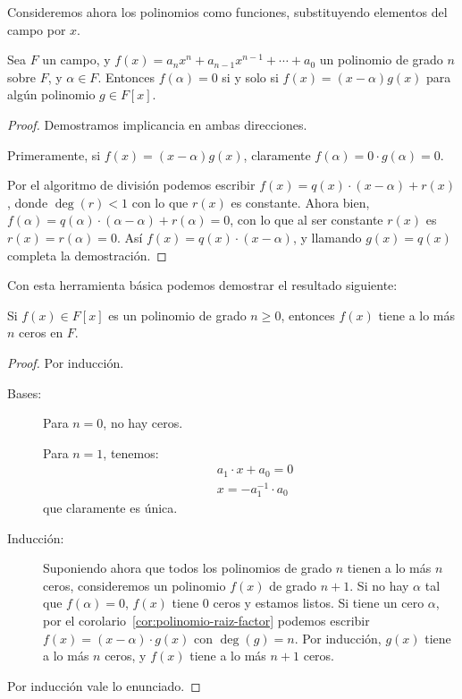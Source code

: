   Consideremos ahora los polinomios como funciones,
  substituyendo elementos del campo por \(x\).

  \begin{corollary}
    \label{cor:polinomio-raiz-factor}
    Sea \(F\) un campo,
    y \(f(x) = a_n x^n + a_{n - 1} x^{n - 1} + \dotsb + a_0\)
    un polinomio de grado \(n\) sobre \(F\),
    y \(\alpha \in F\).
    Entonces \(f(\alpha) = 0\)
    si y solo si \(f(x) = (x - \alpha) g(x)\)
    para algún polinomio \(g \in F[x]\).
  \end{corollary}
  \begin{proof}
    Demostramos implicancia en ambas direcciones.

    Primeramente,
    si \(f(x) = (x - \alpha) g(x)\),
    claramente \(f(\alpha) = 0 \cdot g(\alpha) = 0\).

    Por el algoritmo de división podemos escribir
    \(f(x) = q(x) \cdot (x - \alpha) + r(x)\),
    donde \(\deg(r) < 1\)
    con lo que \(r(x)\) es constante.
    Ahora bien,
    \(f(\alpha)
       = q(\alpha) \cdot (\alpha - \alpha) + r(\alpha) = 0\),
    con lo que al ser constante
      \(r(x)\) es \(r(x) = r(\alpha) = 0\).
    Así \(f(x) = q(x) \cdot (x - \alpha)\),
    y llamando \(g(x) = q(x)\) completa la demostración.
  \end{proof}
  Con esta herramienta básica podemos demostrar
  el resultado siguiente:
  \begin{corollary}
    \label{cor:numero-raices-polinomio}
    Si \(f(x) \in F[x]\) es un polinomio de grado \(n \ge 0\),
    entonces \(f(x)\) tiene a lo más \(n\) ceros en \(F\).
  \end{corollary}
  \begin{proof}
    Por inducción.%
    \begin{description}
    \item[Bases:]
      Para \(n = 0\),
      no hay ceros.

      Para \(n = 1\),
      tenemos:
      \begin{align*}
	&a_1 \cdot x + a_0
	  = 0 \\
	&x
	  = - a_1^{-1} \cdot a_0
      \end{align*}
      que claramente es única.
    \item[Inducción:]
      Suponiendo ahora que todos los polinomios de grado \(n\)
      tienen a lo más \(n\) ceros,
      consideremos un polinomio \(f(x)\) de grado \(n + 1\).
      Si no hay \(\alpha\) tal que \(f(\alpha) = 0\),
      \(f(x)\) tiene 0 ceros y estamos listos.
      Si tiene un cero \(\alpha\),
      por el corolario~\ref{cor:polinomio-raiz-factor}
      podemos escribir \(f(x) = (x - \alpha) \cdot g(x)\)
      con \(\deg(g) = n\).
      Por inducción,
      \(g(x)\) tiene a lo más \(n\) ceros,
      y \(f(x)\) tiene a lo más \(n + 1\) ceros.
    \end{description}
    Por inducción vale lo enunciado.
  \end{proof}

